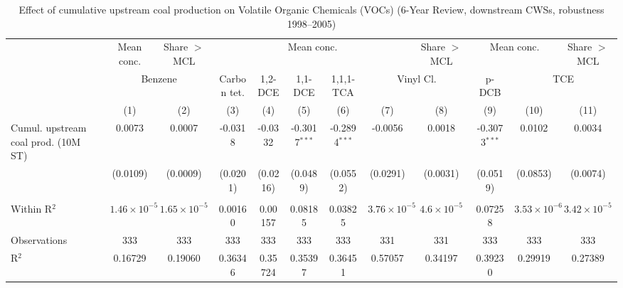 
\begin{table}[htbp]
   
   \caption{\label{tab:6yr_huc02fe_voc_2005} Effect of cumulative upstream coal production on Volatile Organic Chemicals (VOCs) (6-Year Review, downstream CWSs, robustness 1998--2005)}
   \bigskip
   
   \centering
   
   \begin{adjustbox}{width = \textwidth, center}
      
      
      \begin{tabular}{lccccccccccc}
         \toprule
         
          & Mean conc. & Share $>$ MCL & \multicolumn{5}{c}{Mean conc.} & Share $>$ MCL & \multicolumn{2}{c}{Mean conc.} & Share $>$ MCL\\
         
          & \multicolumn{2}{c}{Benzene} & Carbon tet. & 1,2-DCE & 1,1-DCE & 1,1,1-TCA & \multicolumn{2}{c}{Vinyl Cl.} & p-DCB & \multicolumn{2}{c}{TCE} \\ 
         
                                             & (1)                   & (2)                   & (3)           & (4)           & (5)             & (6)             & (7)                   & (8)                  & (9)             & (10)                  & (11)\\  
         
         \midrule 
         Cumul. upstream coal prod. (10M ST) & 0.0073                & 0.0007                & -0.0318       & -0.0332       & -0.3017$^{***}$ & -0.2894$^{***}$ & -0.0056               & 0.0018               & -0.3073$^{***}$ & 0.0102                & 0.0034\\   
                                             & (0.0109)              & (0.0009)              & (0.0201)      & (0.0216)      & (0.0489)        & (0.0552)        & (0.0291)              & (0.0031)             & (0.0519)        & (0.0853)              & (0.0074)\\   
         
          \\
         
         Within R$^2$                        & $1.46\times 10^{-5}$  & $1.65\times 10^{-5}$  & 0.00160       & 0.00157       & 0.08185         & 0.03825         & $3.76\times 10^{-5}$  & $4.6\times 10^{-5}$  & 0.07258         & $3.53\times 10^{-6}$  & $3.42\times 10^{-5}$\\   
         Observations                        & 333                   & 333                   & 333           & 333           & 333             & 333             & 331                   & 331                  & 333             & 333                   & 333\\  
         R$^2$                               & 0.16729               & 0.19060               & 0.36346       & 0.35724       & 0.35397         & 0.36451         & 0.57057               & 0.34197              & 0.39230         & 0.29919               & 0.27389\\  
         

\end{tabular}
\end{adjustbox}
\end{table}
